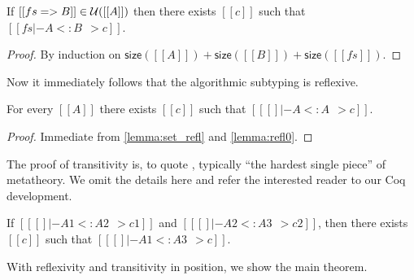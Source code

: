 \begin{lemma} \label{lemma:refl0}
  If $[[fs => B]] \in \mathcal{U}([[A]])$ then there exists $[[c]]$ such that $[[fs |- A <: B ~~> c]]$.
\end{lemma}
\begin{proof}
  By induction on $\mathsf{size}([[A]]) + \mathsf{size}([[B]]) + \mathsf{size}([[fs]])$.
\end{proof}

Now it immediately follows that the algorithmic subtyping is reflexive.

\begin{lemma} \label{lemma:refl}
  For every $[[A]]$ there exists $[[c]]$ such that $[[ [] |- A <: A ~~> c]]$.
\end{lemma}
\begin{proof}
  Immediate from \cref{lemma:set_refl} and \cref{lemma:refl0}.
\end{proof}

The proof of transitivity is, to quote \citet{pierce1989decision}, typically
``the hardest single piece'' of metatheory. We omit the details here and
refer the interested reader to our Coq development.

\begin{lemma} \label{lemma:trans}
  If $[[ [] |- A1 <: A2 ~~> c1]]$ and $[[ [] |- A2 <: A3 ~~> c2]]$, then there
  exists $[[c]]$ such that $[[ [] |- A1 <: A3 ~~> c]]$.
\end{lemma}

With reflexivity and transitivity in position, we show the main theorem.


